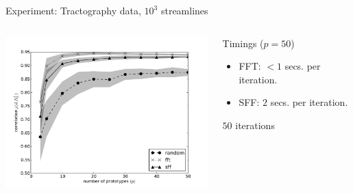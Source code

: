 \documentclass{beamer}
\begin{document}
\begin{frame}{Experiment: Tractography data, $10^3$ streamlines}
  \begin{columns}
    \begin{column}{0.7\linewidth}
      \begin{center}
        \includegraphics[width=8.5cm]{tracks_1K_correlation_policies}
      \end{center}
    \end{column}
    \begin{column}{0.3\linewidth}
      \begin{block}{Timings ($p=50$)}
        \begin{itemize}
        \item FFT: $<1$ secs. per iteration.
        \item SFF: $2$ secs. per iteration.
        \end{itemize}
      \end{block}
      $50$ iterations
    \end{column}
  \end{columns}
\end{frame}
\end{document}
